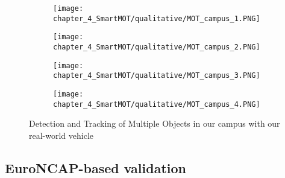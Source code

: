 \begin{figure}[h]
	\centering
	\begin{subfigure}{0.43\textwidth}
		\captionsetup{justification=centering}
		\texttt{[image: chapter\_4\_SmartMOT/qualitative/MOT\_campus\_1.PNG]}
		\caption{}
	\end{subfigure}
	\hfill
	\begin{subfigure}{0.43\textwidth}
		\captionsetup{justification=centering}
		\texttt{[image: chapter\_4\_SmartMOT/qualitative/MOT\_campus\_2.PNG]}
		\caption{}
	\end{subfigure}
	\hfill
	\begin{subfigure}{0.43\textwidth}
		\captionsetup{justification=centering}
		\texttt{[image: chapter\_4\_SmartMOT/qualitative/MOT\_campus\_3.PNG]}
		\caption{}
	\end{subfigure}
	\hfill
	\begin{subfigure}{0.43\textwidth}
		\captionsetup{justification=centering}
		\texttt{[image: chapter\_4\_SmartMOT/qualitative/MOT\_campus\_4.PNG]}
		\caption{}
	\end{subfigure}
	\caption{Detection and Tracking of Multiple Objects in our campus with our real-world vehicle}
	\label{fig:chapter_4_SmartMOT/MOT_campus}
\end{figure}

\subsection{EuroNCAP-based validation}
\label{subsec:4_euroncap}

